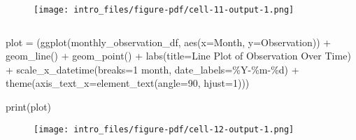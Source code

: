 \documentclass[
  letterpaper,
  DIV=11,
  numbers=noendperiod]{scrreprt}
\newenvironment{Shaded}{\begin{snugshade}}{\end{snugshade}}
\newcommand{\BuiltInTok}[1]{\textcolor[rgb]{0.00,0.23,0.31}{#1}}
\newcommand{\DecValTok}[1]{\textcolor[rgb]{0.68,0.00,0.00}{#1}}
\newcommand{\NormalTok}[1]{\textcolor[rgb]{0.00,0.23,0.31}{#1}}
\newcommand{\OperatorTok}[1]{\textcolor[rgb]{0.37,0.37,0.37}{#1}}
\newcommand{\SpecialCharTok}[1]{\textcolor[rgb]{0.37,0.37,0.37}{#1}}
\newcommand{\StringTok}[1]{\textcolor[rgb]{0.13,0.47,0.30}{#1}}
\begin{document}
\begin{figure}[H]

{\centering \texttt{[image: intro\_files/figure-pdf/cell-11-output-1.png]}

}

\end{figure}

\begin{verbatim}
\end{verbatim}

\begin{Shaded}
\begin{Highlighting}[]
\NormalTok{plot }\OperatorTok{=}\NormalTok{ (ggplot(monthly\_observation\_df, aes(x}\OperatorTok{=}\StringTok{\textquotesingle{}Month\textquotesingle{}}\NormalTok{, y}\OperatorTok{=}\StringTok{\textquotesingle{}Observation\textquotesingle{}}\NormalTok{)) }\OperatorTok{+}
\NormalTok{        geom\_line() }\OperatorTok{+}
\NormalTok{        geom\_point() }\OperatorTok{+}
\NormalTok{        labs(title}\OperatorTok{=}\StringTok{\textquotesingle{}Line Plot of Observation Over Time\textquotesingle{}}\NormalTok{) }\OperatorTok{+} 
\NormalTok{        scale\_x\_datetime(breaks}\OperatorTok{=}\StringTok{\textquotesingle{}1 month\textquotesingle{}}\NormalTok{,  date\_labels}\OperatorTok{=}\StringTok{\textquotesingle{}\%Y{-}\%m{-}}\SpecialCharTok{\%d}\StringTok{\textquotesingle{}}\NormalTok{) }\OperatorTok{+} 
\NormalTok{        theme(axis\_text\_x}\OperatorTok{=}\NormalTok{element\_text(angle}\OperatorTok{=}\DecValTok{90}\NormalTok{, hjust}\OperatorTok{=}\DecValTok{1}\NormalTok{)))}

\BuiltInTok{print}\NormalTok{(plot)}
\end{Highlighting}
\end{Shaded}

\begin{figure}[H]

{\centering \texttt{[image: intro\_files/figure-pdf/cell-12-output-1.png]}

}

\end{figure}

\begin{verbatim}
\end{verbatim}
\end{document}

